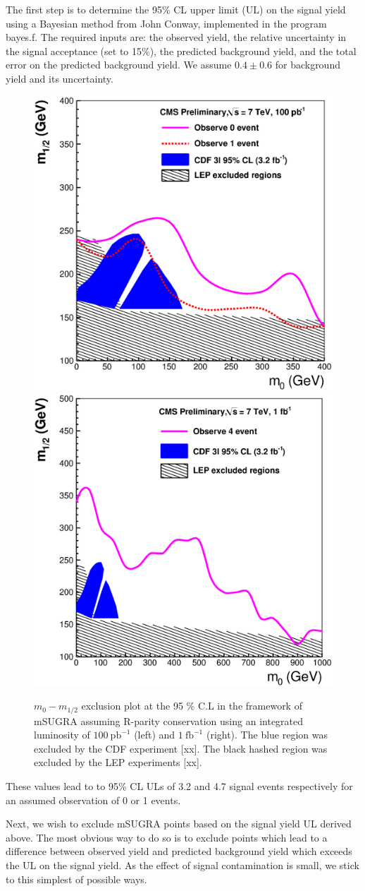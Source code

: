 The first  step is to  determine the 95\%  CL upper limit (UL)  on the
signal yield using a Bayesian  method from John Conway, implemented in
the program bayes.f. The required  inputs are: the observed yield, the
relative  uncertainty in  the  signal acceptance  (set  to 15\%),  the
predicted  background yield,  and  the total  error  on the  predicted
background yield. We assume $0.4 \pm 0.6$ for background yield and 
its uncertainty.
\vspace{3 mm}
\begin{figure}[htb]
\begin{center}

\includegraphics[width=0.485\linewidth]{figs/exclusion100ss.eps}
\includegraphics[width=0.485\linewidth]{figs/exclusion1fbss.eps}
\caption{ $m_{0}-m_{1/2}$ exclusion plot at the 95 \% C.L in the framework of 
mSUGRA assuming R-parity conservation using an  integrated  luminosity of  
$100~\mathrm{pb}^{-1}$ (left) and $1~\mathrm{fb}^{-1}$ (right). The blue region
was excluded by the CDF experiment [xx]. The black hashed region was excluded
by the LEP experiments [xx].\label{fig:ss_exclusion}}

\end{center}
\end{figure}

These values lead to 
to  95\% CL  ULs  of 3.2 and 4.7  signal  events respectively for an assumed 
observation of 0 or 1 events.

Next, we  wish to exclude mSUGRA  points based on the  signal yield UL
derived above.   The most obvious  way to do  so is to  exclude points
which  lead  to a  difference  between  observed  yield and  predicted
background yield  which exceeds the  UL on the signal  yield. 
As the effect of signal contamination is small, we stick to this simplest 
of possible ways.

